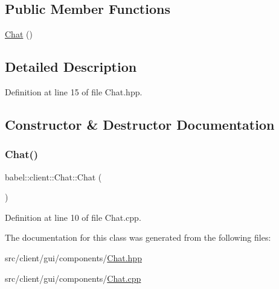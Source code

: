 \subsection*{Public Member Functions}
\begin{DoxyCompactItemize}
\item 
\mbox{\hyperlink{classbabel_1_1client_1_1_chat_ac272434060dafcb24bcd8c176f8e2c32}{Chat}} ()
\end{DoxyCompactItemize}


\subsection{Detailed Description}


Definition at line 15 of file Chat.\+hpp.



\subsection{Constructor \& Destructor Documentation}
\mbox{\label{classbabel_1_1client_1_1_chat_ac272434060dafcb24bcd8c176f8e2c32}} 
\subsubsection{\texorpdfstring{Chat()}{Chat()}}
{\footnotesize\ttfamily babel\+::client\+::\+Chat\+::\+Chat (\begin{DoxyParamCaption}{ }\end{DoxyParamCaption})}



Definition at line 10 of file Chat.\+cpp.



The documentation for this class was generated from the following files\+:\begin{DoxyCompactItemize}
\item 
src/client/gui/components/\mbox{\hyperlink{_chat_8hpp}{Chat.\+hpp}}\item 
src/client/gui/components/\mbox{\hyperlink{_chat_8cpp}{Chat.\+cpp}}\end{DoxyCompactItemize}
